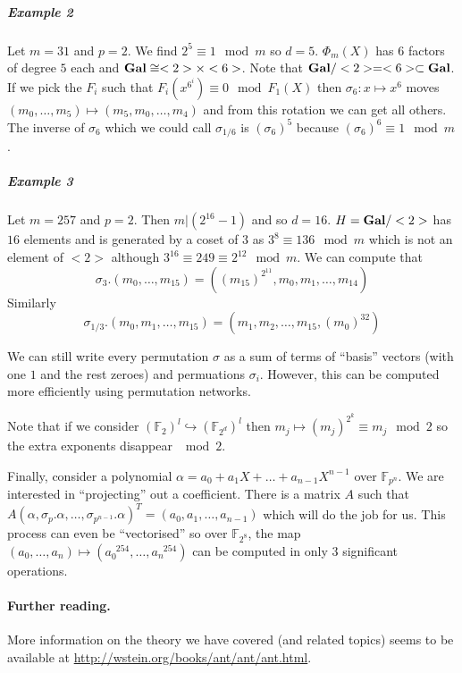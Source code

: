 \documentclass[11pt]{article}
\newcommand{\F}{\mathbb{F}}
\newcommand{\Gal}{\textup{\textbf{Gal}}}
\begin{document}
\subparagraph{Example 2}
Let $m = 31$ and $p = 2$.
We find $2^5 \equiv 1 \mod m$ so $d = 5$.
$\Phi_m(X)$ has $6$ factors of degree $5$ each and $\Gal \cong <2> \times <6>$.
Note that $\Gal / <2> = <6> \subset \Gal$.
If we pick the $F_i$ such that $F_i(x^{6^i}) \equiv 0 \mod F_1(X)$ then $\sigma_6: x \mapsto x^6$ moves $(m_0, \ldots, m_5) \mapsto (m_5, m_0, \ldots, m_4)$ and from this rotation we can get all others.
The inverse of $\sigma_6$ which we could call $\sigma_{1/6}$ is $(\sigma_6)^5$ because $(\sigma_6)^6 \equiv 1 \mod m$.

\subparagraph{Example 3}
Let $m = 257$ and $p = 2$.
Then $m | (2^{16} - 1)$ and so $d = 16$.
$H = \Gal/<2>$ has $16$ elements and is generated by a coset of $3$ as $3^8 \equiv 136 \mod m$ which is not an element of $<2>$ although $3^{16} \equiv 249 \equiv 2^{12} \mod m$.
We can compute that 
$$\sigma_3 . (m_0, \ldots, m_{15}) = ((m_{15})^{2^{11}}, m_0, m_1, \ldots, m_{14})$$
Similarly 
$$\sigma_{1/3} . (m_0, m_1, \ldots, m_{15}) = (m_1, m_2, \ldots, m_{15}, (m_0)^{32})$$

We can still write every permutation $\sigma$ as a sum of terms of ``basis'' vectors (with one $1$ and the rest zeroes) and permuations $\sigma_i$.
However, this can be computed more efficiently using permutation networks.

Note that if we consider $(\F_2)^l \hookrightarrow (\F_{2^d})^l$ then $m_j \mapsto (m_j)^{2^k} \equiv m_j \mod 2$ so the extra exponents disappear $\mod 2$.

Finally, consider a polynomial $\alpha = a_0 + a_1 X + \ldots + a_{n-1} X^{n-1}$ over $\F_{p^n}$.
We are interested in ``projecting'' out a coefficient.
There is a matrix $A$ such that $A (\alpha, \sigma_p.\alpha, \ldots, \sigma_{p^{n-1}} . \alpha)^T = (a_0, a_1, \ldots, a_{n-1})$ which will do the job for us.
This process can even be ``vectorised'' so over $\F_{2^8}$, the map $(a_0, \ldots, a_n) \mapsto (a_0^{\phantom{0}254}, \ldots, a_n^{\phantom{n}254})$ can be computed in only $3$ significant operations.

\paragraph{Further reading.}
More information on the theory we have covered (and related topics) seems to be available at \url{http://wstein.org/books/ant/ant/ant.html}.

\end{document}

